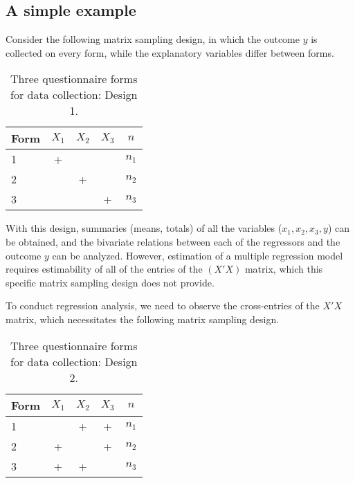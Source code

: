 \documentclass[11pt]{asaproc}
\begin{document}
\subsection{A simple example}

Consider the following matrix sampling design, in which
the outcome $y$ is collected on every form, while the explanatory variables
differ between forms.

\begin{table}[!h]

\centering

\caption{Three questionnaire forms for data collection: Design 1. \label{tab:forms3:design1}}

\begin{tabular}{l|ccc|c}
    Form & $X_1$ & $X_2$ & $X_3$ & $n$ \\
    \hline
    1   & + & & & $n_1$ \\
    2   & & + & & $n_2$ \\
    3   & & & + & $n_3$ \\
\end{tabular}

\end{table}

With this design, summaries (means, totals) of all the variables
($x_1,x_2,x_3,y$) can be obtained, and the bivariate relations
between each of the regressors and the outcome $y$ can be analyzed.
However, estimation of a multiple regression model requires
estimability of all of the entries of the $(X'X)$ matrix,
which this specific matrix sampling design does not provide.

To conduct regression analysis, we need to observe the cross-entries
of the $X'X$ matrix, which necessitates the following matrix sampling design.

\begin{table}[!h]

\centering

\caption{Three questionnaire forms for data collection: Design 2. \label{tab:forms3:design2}}

\begin{tabular}{l|ccc|c}
    Form & $X_1$ & $X_2$ & $X_3$ & $n$ \\
    \hline
    1   & & + & + & $n_1$ \\
    2   & + & & + & $n_2$ \\
    3   & + & + & & $n_3$ \\
\end{tabular}

\end{table}
\end{document}
